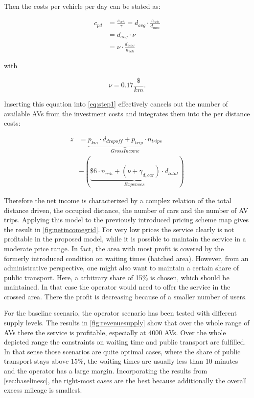 Then the costs per vehicle per day can be stated as:

\begin{equation}\begin{aligned}
c_{pd} &= \frac{c_{veh}}{\tau} = d_{avg} \cdot \frac{c_{veh}}{d_{max}} \\
&= d_{avg} \cdot \nu\\
&= \nu \cdot \frac{d_{total}}{n_{veh}}
\end{aligned}\end{equation}

with

\begin{equation}
\nu = 0.17 \frac{\$}{km}.
\end{equation}

Inserting this equation into \cref{eq:step1} effectively cancels out the number
of available AVs from the investment costs and integrates them into the per
distance costs:

\begin{equation}\begin{aligned}
z
&= \underbrace{p_{km} \cdot d_{dropoff} + p_{trip} \cdot n_{trips}}_{Gross Income}\\
&- \left( \underbrace{\$6 \cdot n_{veh} + (\nu + \gamma_{d,car}) \cdot d_{total}}_{Expenses} \right)
\label{eq:step1}
\end{aligned}\end{equation}

Therefore the net income is characterized by a complex relation of the total distance
driven, the occupied distance, the number of cars and the number of AV trips. Applying
this model to the previously introduced pricing scheme map gives the result in
\cref{fig:netincomegrid}. For very low prices the service clearly is not profitable
in the proposed model, while it is possible to maintain the service in a moderate
price range. In fact, the area with most profit is covered by the formerly introduced
condition on waiting times (hatched area). However, from an administrative perspective,
one might also want to maintain a certain share of public transport. Here, a arbitrary
share of 15\% is chosen, which should be maintained. In that case the operator would need to offer the service
in the crossed area. There the profit is decreasing because of a smaller
number of users.

For the baseline scenario, the operator scenario has been tested with different
supply levels. The results in \cref{fig:revenuesupply} show that over the whole
range of AVs there the service is profitable, especially at 4000 AVs. Over the whole
depicted range the constraints on waiting time and public transport are fulfilled.
In that sense those scenarios are quite optimal cases, where the share of
public transport stays above 15\%, the waiting times are usually less than 10
minutes and the operator has a large margin. Incorporating the results from
\cref{sec:baselinesc}, the right-most cases are the best because additionally
the overall excess mileage is smallest.

